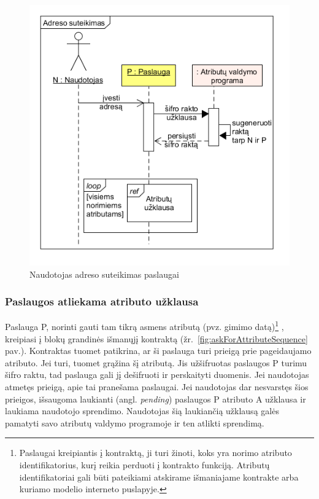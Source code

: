 \begin{figure}[H]
    \centering
    \includegraphics[scale=0.6]{img/userGivesAddress}
    \caption{Naudotojas adreso suteikimas paslaugai}
    \label{fig:userGivesAddress}
\end{figure}

\subsubsection{Paslaugos atliekama atributo užklausa} \label{BCIDM:askForAttribute}

Paslauga P, norinti gauti tam tikrą asmens atributą (pvz. gimimo datą)\footnote{ Paslaugai kreipiantis į kontraktą, ji turi žinoti, koks yra norimo atributo identifikatorius, kurį reikia perduoti į kontrakto funkciją. 
Atributų identifikatoriai gali būti pateikiami atskirame išmaniajame kontrakte arba kuriamo modelio interneto puslapyje.}
, kreipiasi į blokų grandinės išmanųjį kontraktą (žr.\hypertarget{fig:askForAttributeSequence}{~\ref{fig:askForAttributeSequence} pav.}).
Kontraktas tuomet patikrina, ar ši paslauga turi prieigą prie pageidaujamo atributo. Jei turi, tuomet grąžina šį atributą. Jis
užšifruotas paslaugos P turimu šifro raktu, tad paslauga gali jį dešifruoti ir perskaityti duomenis. Jei
naudotojas atmetęs prieigą, apie tai pranešama paslaugai. Jei naudotojas dar nesvarstęs šios prieigos, išsaugoma laukianti
(angl. \textit{pending}) paslaugos P atributo A užklausa ir laukiama naudotojo sprendimo. Naudotojas šią laukiančią užklausą galės pamatyti savo 
atributų valdymo programoje ir ten atlikti sprendimą.


